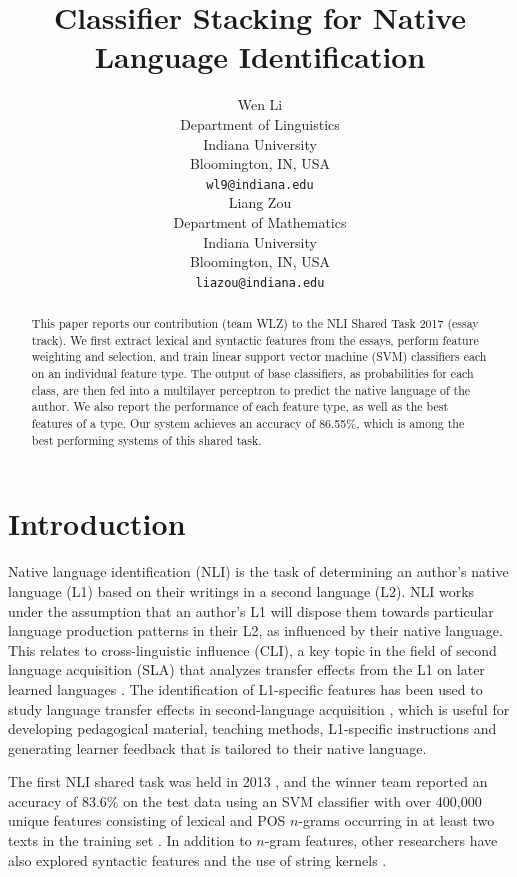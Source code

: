 \documentclass[11pt,letterpaper]{article}
\title{Classifier Stacking for Native Language Identification}
\author{Wen Li \\
  Department of Linguistics \\
  Indiana University \\
  Bloomington, IN, USA \\
  {\tt wl9@indiana.edu} \\\And
  Liang Zou \\
  Department of Mathematics \\
  Indiana University \\
  Bloomington, IN, USA \\
  {\tt liazou@indiana.edu} \\}
\date{}
\begin{document}
\maketitle
\begin{abstract}
This paper reports our contribution (team WLZ) to the NLI Shared Task 2017 (essay track). We first extract lexical and syntactic features from the essays, perform feature weighting and selection, and train linear support vector machine (SVM) classifiers each on an individual feature type. The output of base classifiers, as probabilities for each class, are then fed into a multilayer perceptron to predict the native language of the author. We also report the performance of each feature type, as well as the best features of a type. Our system achieves an accuracy of 86.55\%, which is among the best performing systems of this shared task.

\end{abstract}

\section{Introduction}
\label{intro}

Native language identification (NLI) is the task of determining an author's native language (L1) based on their writings in a second language (L2). NLI works under the assumption that an author's L1 will dispose them towards particular language production patterns in their L2, as influenced by their native language. This relates to cross-linguistic influence (CLI), a key topic in the field of second language acquisition (SLA) that analyzes transfer effects from the L1 on later learned languages \cite{malmasi2016}. The identification of L1-specific features has been used to study language transfer effects in second-language acquisition \cite{malmasi2014}, which is useful for developing pedagogical material, teaching methods, L1-specific instructions and generating learner feedback that is tailored to their native language.

The first NLI shared task was held in 2013 \cite{nli2013}, and the winner team reported an accuracy of 83.6\% on the test data using an SVM classifier with over 400,000 unique features consisting of lexical and POS $n$-grams occurring in at least two texts in the training set \cite{jarvis-bestgen-pepper:2013:BEA8}. In addition to $n$-gram features, other researchers have also explored syntactic features \cite{bykh:2014} and the use of string kernels \cite{ionescu:2014}.
\end{document}

